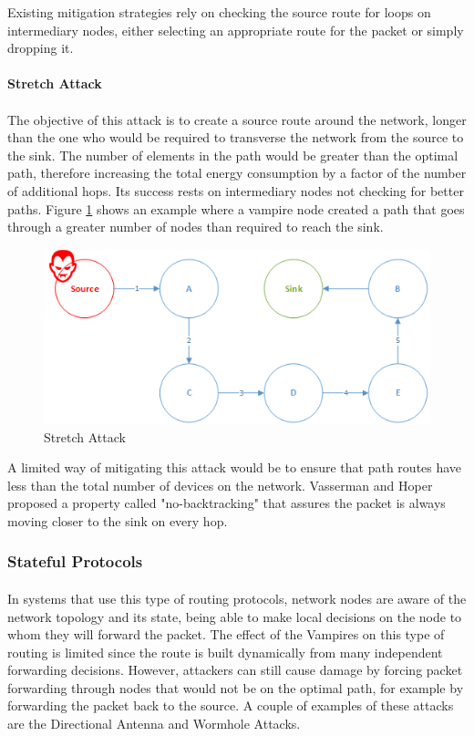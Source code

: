 Existing mitigation strategies rely on checking the source route for loops on intermediary nodes, either selecting an appropriate route for the packet or simply dropping it.

\paragraph{\textbf{Stretch Attack}}
\paragraph{}
The objective of this attack is to create a source route around the network, longer than the one who would be required to transverse the network from the source to the sink. The number of elements in the path would be greater than the optimal path, therefore increasing the total energy consumption by a factor of the number of additional hops. Its success rests on intermediary nodes not checking for better paths. Figure \ref{fig:stretch_attack} shows an example where a vampire node created a path that goes through a greater number of nodes than required to reach the sink.

\begin{figure}[h]
  \centering
  \includegraphics[width=0.8\linewidth]{figures/Stretch_Attack.png}
  \caption{Stretch Attack}
  \label{fig:stretch_attack}
\end{figure}

A limited way of mitigating this attack would be to ensure that path routes have less than the total number of devices on the network. Vasserman and Hoper proposed a property called "no-backtracking" that assures the packet is always moving closer to the sink on every hop. \cite{Vasserman2013}

\subsubsection{Stateful Protocols}
\label{sec:tables_routing}
\paragraph{}
In systems that use this type of routing protocols, network nodes are aware of the network topology and its state, being able to make local decisions on the node to whom they will forward the packet. The effect of the Vampires on this type of routing is limited since the route is built dynamically from many independent forwarding decisions. However, attackers can still cause damage by forcing packet forwarding through nodes that would not be on the optimal path, for example by forwarding the packet back to the source. A couple of examples of these attacks are the Directional Antenna and Wormhole Attacks.

